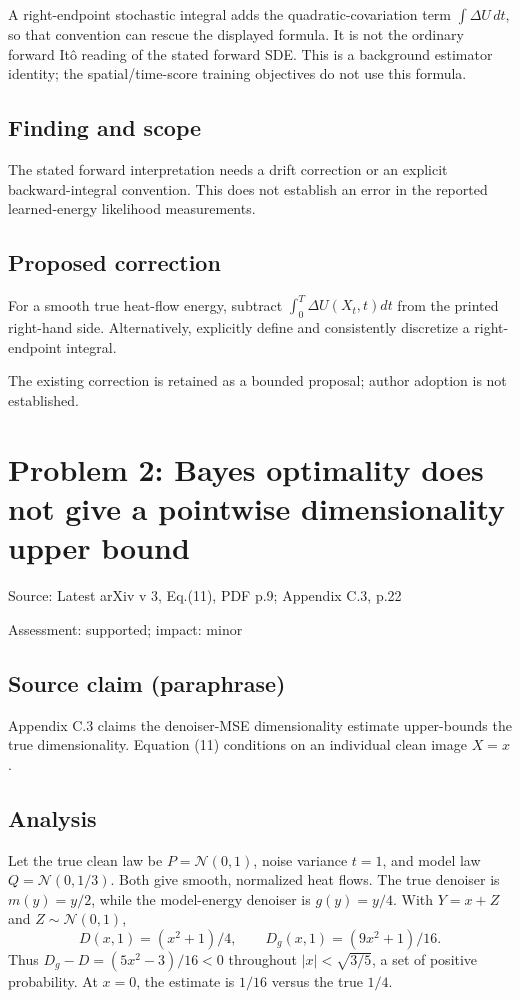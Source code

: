 \documentclass[11pt]{article}
\begin{document}
A right-endpoint stochastic integral adds the quadratic-covariation term \(\int\Delta U\,dt\), so that convention can rescue the displayed formula. It is not the ordinary forward Itô reading of the stated forward SDE. This is a background estimator identity; the spatial/time-score training objectives do not use this formula.

\subsection*{Finding and scope}

The stated forward interpretation needs a drift correction or an explicit backward-integral convention. This does not establish an error in the reported learned-energy likelihood measurements.

\subsection*{Proposed correction}

For a smooth true heat-flow energy, subtract \(\int_0^T\Delta U(X_t,t)dt\) from the printed right-hand side. Alternatively, explicitly define and consistently discretize a right-endpoint integral.

The existing correction is retained as a bounded proposal; author adoption is not established.

\section*{Problem 2: Bayes optimality does not give a pointwise dimensionality upper bound}

Source: Latest arXiv v 3, Eq.(11), PDF p.9; Appendix C.3, p.22

Assessment: supported; impact: minor

\subsection*{Source claim (paraphrase)}

Appendix C.3 claims the denoiser-MSE dimensionality estimate upper-bounds the true dimensionality. Equation (11) conditions on an individual clean image \(X=x\).

\subsection*{Analysis}

Let the true clean law be \(P=\mathcal N(0,1)\), noise variance \(t=1\), and model law \(Q=\mathcal N(0,1/3)\). Both give smooth, normalized heat flows. The true denoiser is \(m(y)=y/2\), while the model-energy denoiser is \(g(y)=y/4\). With \(Y=x+Z\) and \(Z\sim\mathcal N(0,1)\), \[D(x,1)=(x^2+1)/4,\qquad D_g(x,1)=(9x^2+1)/16.\] Thus \(D_g-D=(5x^2-3)/16<0\) throughout \(|x|<\sqrt{3/5}\), a set of positive probability. At \(x=0\), the estimate is \(1/16\) versus the true \(1/4\).
\end{document}
